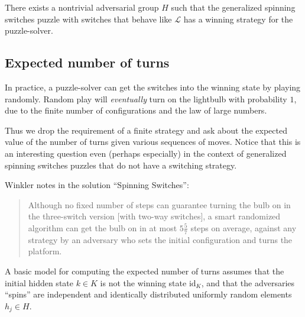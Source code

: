 \begin{conjecture}
  There exists a nontrivial adversarial group $H$ such that the generalized
  spinning switches puzzle with switches that behave like $\mathcal{L}$ has
  a winning strategy for the puzzle-solver.
\end{conjecture}

\subsection{Expected number of turns}
In practice, a puzzle-solver can get the switches into the winning state by
playing randomly.
Random play will \textit{eventually} turn on the lightbulb with probability $1$,
due to the finite number of configurations and the law of large numbers.

Thus we drop the requirement of a finite strategy and
ask about the expected value of the number of turns given
various sequences of moves.
Notice that this is an interesting question even (perhaps especially)
in the context of generalized spinning switches puzzles that do not have a
switching strategy.

Winkler \cite{Winkler2021}
notes in the solution ``Spinning Switches'':
\begin{quote}
  Although no fixed number of steps can guarantee turning the bulb on in the
  three-switch version [with two-way switches],
  a smart randomized algorithm can get the bulb on in at most $5 \frac{5}{7}$
  steps on average, against any strategy by an adversary who sets the initial
  configuration and turns the platform. \cite{Winkler2021}
\end{quote}

%

%
A basic model for computing the expected number of turns assumes that
the initial hidden state $k \in K$ is not the winning state $\mathrm{id}_K$,
and that the adversaries ``spins'' are independent and identically distributed
uniformly random elements $h_j \in H$.

